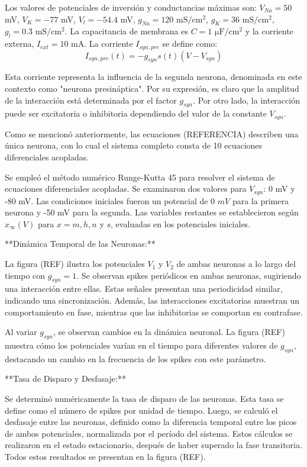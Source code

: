 \documentclass[aps,prb,twocolumn,superscriptaddress,floatfix,longbibliography]{revtex4-2}
\newcounter{para}
\begin{document}
Los valores de potenciales de inversión y conductancias máximas son: $V_{Na} = 50$ mV, $V_K = -77$ mV, $V_l = -54.4$ mV, $g_{Na} = 120$ $\mathrm{mS/cm^2}$, $g_K = 36$ $\mathrm{mS/cm^2}$, $g_l = 0.3$ $\mathrm{mS/cm^2}$. La capacitancia de membrana es $C = 1$ $\mathrm{\mu F/cm^2}$ y la corriente externa, $I_{ext} = 10$ mA. La corriente $I_{syn, pre}$ se define como:
\[I_{syn, pre}(t) = -g_{syn} s(t) (V - V_{syn})\]

Esta corriente representa la influencia de la segunda neurona, denominada en este contexto como "neurona presináptica". Por su expresión, es claro que la amplitud de la interacción está determinada por el factor $g_{syn}$. Por otro lado, la interacción puede ser excitatoria o inhibitoria dependiendo del valor de la constante $V_{syn}$.

Como se mencionó anteriormente, las ecuaciones (REFERENCIA) describen una única neurona, con lo cual el sistema completo consta de 10 ecuaciones diferenciales acopladas.

Se empleó el método numérico Runge-Kutta 45 para resolver el sistema de ecuaciones diferenciales acopladas. Se examinaron dos valores para \(V_{syn}\): 0 mV y -80 mV. Las condiciones iniciales fueron un potencial de 0 \(mV\) para la primera neurona y -50 mV para la segunda. Las variables restantes se establecieron según \(x_\infty(V)\) para \(x = m, h, n\) y \(s\), evaluadas en los potenciales iniciales.

**Dinámica Temporal de las Neuronas:**

La figura (REF) ilustra los potenciales \(V_1\) y \(V_2\) de ambas neuronas a lo largo del tiempo con \(g_{syn} = 1\). Se observan spikes periódicos en ambas neuronas, sugiriendo una interacción entre ellas. Estas señales presentan una periodicidad similar, indicando una sincronización. Además, las interacciones excitatorias muestran un comportamiento en fase, mientras que las inhibitorias se comportan en contrafase.

Al variar \(g_{syn}\), se observan cambios en la dinámica neuronal. La figura (REF) muestra cómo los potenciales varían en el tiempo para diferentes valores de \(g_{syn}\), destacando un cambio en la frecuencia de los spikes con este parámetro.

**Tasa de Disparo y Desfasaje:**

Se determinó numéricamente la tasa de disparo de las neuronas. Esta tasa se define como el número de spikes por unidad de tiempo. Luego, se calculó el desfasaje entre las neuronas, definido como la diferencia temporal entre los picos de ambos potenciales, normalizada por el período del sistema. Estos cálculos se realizaron en el estado estacionario, después de haber superado la fase transitoria. Todos estos resultados se presentan en la figura (REF).
\end{document}
